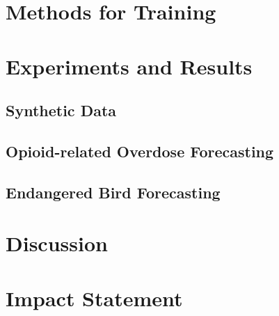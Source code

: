 \documentclass{article}
\begin{document}
\section{Methods for Training}
\label{sec:methods_train}




\section{Experiments and Results}
\label{sec:results}



\subsection{Synthetic Data}
\label{sec:results_synth1D}




\subsection{Opioid-related Overdose Forecasting}
\label{sec:results_opioid}


\subsection{Endangered Bird Forecasting}
\label{sec:results_birds}



\section{Discussion}
\label{sec:discussion}


\section*{Impact Statement}







\appendix
\onecolumn

\end{document}
